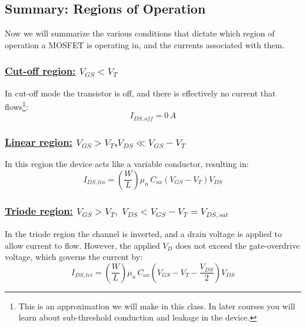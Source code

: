 \subsection{Summary: Regions of Operation}
Now we will summarize the various conditions that dictate which region of operation a MOSFET is operating in, and the currents associated with them.
\subsubsection{\textbf{\underline{Cut-off region:}} $V_{GS} < V_T$}
\vspace{0.1cm}
In cut-off mode the transistor is off, and there is effectively no current that flows\footnote{This is an approximation we will make in this class.  In later courses you will learn about sub-threshold conduction and leakage in the device.}:
    \begin{equation}
        \boxed{I_{DS,off} = 0\,A}
    \end{equation}
\subsubsection{\textbf{\underline{Linear region:}} $V_{GS} > V_T$,\;$V_{DS} \ll V_{GS} - V_T$}
\vspace{0.1cm}
In this region the device acts like a variable conductor, resulting in:
    \begin{equation}
        \boxed{I_{DS,lin} = \left(\frac{W}{L}\right) \mu_n\,C_{ox} \left(V_{GS} - V_T\right)V_{DS}}
    \end{equation}
\subsubsection{\textbf{\underline{Triode region:}} $V_{GS} > V_T,\;V_{DS} < V_{GS} - V_T = V_{DS,sat}$}
\vspace{0.1cm}
In the triode region the channel is inverted, and a drain voltage is applied to allow current to flow. However, the applied $V_D$ does not exceed the gate-overdrive voltage, which governs the current by:
    \begin{equation}
        \boxed{I_{DS,tri} = \left(\frac{W}{L}\right) \mu_n\,C_{ox} \left(V_{GS} - V_T - \frac{V_{DS}}{2}\right) V_{DS}}
    \end{equation}
